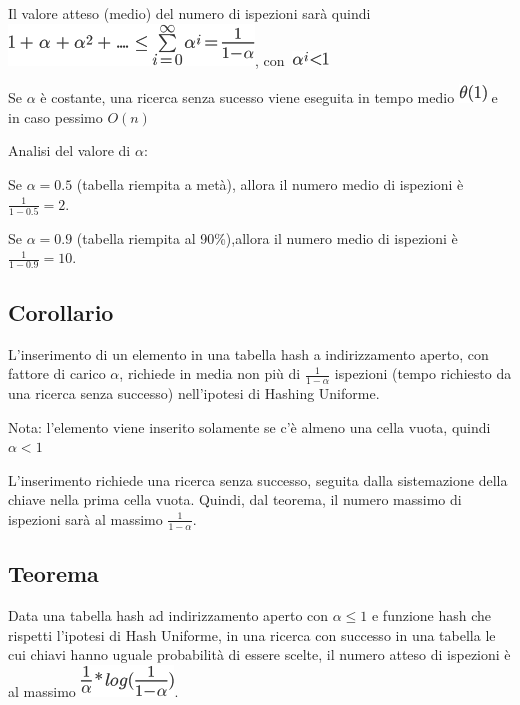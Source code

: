 \documentclass{article}
\begin{document}
{{Il valore atteso (medio) del numero di ispezioni sarà quindi }\includegraphics{images/image325.png}{, con}{~}\includegraphics{images/image326.png}

{Se $\alpha$ è costante, una ricerca senza sucesso viene eseguita in tempo medio \includegraphics{images/image328.png} e in caso pessimo $O(n)$}

{Analisi del valore di $\alpha$:}

{Se $\alpha=0.5$ (tabella riempita a metà), allora il numero medio di ispezioni è $\frac{1}{1-0.5}=2$.}

{Se $\alpha=0.9$ (tabella riempita al 90\%),allora il numero medio di ispezioni è $\frac{1}{1-0.9}=10$.}

\subsection{Corollario}

{L'inserimento di un elemento in una tabella hash a indirizzamento aperto, con fattore di carico $\alpha$, richiede in media non più di $\frac{1}{1-\alpha}$ ispezioni (tempo richiesto da una ricerca senza successo) nell'ipotesi di Hashing Uniforme.}

{Nota: l'elemento viene inserito solamente se c'è almeno una cella vuota, quindi $\alpha < 1$}

{L'inserimento richiede una ricerca senza successo, seguita dalla sistemazione della chiave nella prima cella vuota. Quindi, dal teorema, il numero massimo di ispezioni sarà al massimo $\frac{1}{1-\alpha}$.}

\subsection{Teorema}

{Data una tabella hash ad indirizzamento aperto con $\alpha \leq 1$ e funzione hash che rispetti l'ipotesi di Hash Uniforme, in una ricerca con successo in una tabella le cui chiavi hanno uguale probabilità di essere scelte, il numero atteso di ispezioni è al massimo \includegraphics{images/image334.png}.}

}
\end{document}

